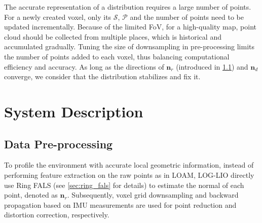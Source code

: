 \documentclass[letterpaper, 10 pt, conference]{ieeeconf}  %
\newcommand{\ie}{i.e.\ }
\begin{document}
The accurate representation of a distribution requires a large number of points.
For a newly created voxel, only its $\mathcal{S}$, $\mathcal{P}$ and the number of points need to be updated incrementally.
Because of the limited FoV, for a high-quality map, point cloud should be collected from multiple places, which is historical and accumulated gradually.
Tuning the size of downsampling in pre-processing limits the number of points added to each voxel, thus balancing computational efficiency and accuracy.
As long as the directions of $\boldsymbol{n}_r$ (introduced in \ref{sec:data_pre}) and $\boldsymbol{n}_d$ converge, we consider that the distribution stabilizes and fix it.

\section{System Description}
\label{sec:system_description}

\subsection{Data Pre-processing}
\label{sec:data_pre}
To profile the environment with accurate local geometric information, instead of performing feature extraction on the raw points as in LOAM, LOG-LIO directly use Ring FALS (see \ref{sec:ring_fals} for details) to estimate the normal of each point, denoted as $\boldsymbol{n}_r$.
Subsequently, voxel grid downsampling and backward propagation based on IMU measurements are used for point reduction and distortion correction, respectively.
\end{document}
